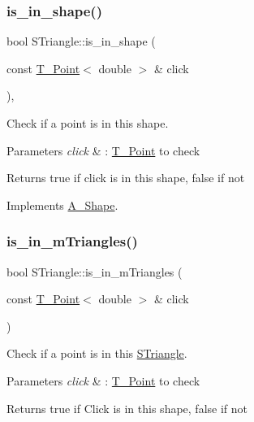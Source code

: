 \subsubsection{\texorpdfstring{is\+\_\+in\+\_\+shape()}{is\_in\_shape()}}
{\footnotesize\ttfamily bool S\+Triangle\+::is\+\_\+in\+\_\+shape (\begin{DoxyParamCaption}\item[{const \hyperlink{classPoint}{T_Point}$<$ double $>$ \&}]{click }\end{DoxyParamCaption})\hspace{0.3cm}{\ttfamily [override]}, {\ttfamily [virtual]}}



Check if a point is in this shape. 


\begin{DoxyParams}{Parameters}
{\em click} & \+: \hyperlink{classPoint}{T_Point} to check \\
\hline
\end{DoxyParams}
\begin{DoxyReturn}{Returns}
true if click is in this shape, false if not 
\end{DoxyReturn}


Implements \hyperlink{classShape_aa09a621da090e42840b4bec7ffb27620}{A_Shape}.

\mbox{\label{classSTriangle_a6824246f68484d8d8159a3315df257a4}} 
\subsubsection{\texorpdfstring{is\+\_\+in\+\_\+mTriangles()}{is\_in\_triangle()}}
{\footnotesize\ttfamily bool S\+Triangle\+::is\+\_\+in\+\_\+mTriangles (\begin{DoxyParamCaption}\item[{const \hyperlink{classPoint}{T_Point}$<$ double $>$ \&}]{click }\end{DoxyParamCaption})}



Check if a point is in this \hyperlink{classSTriangle}{S\+Triangle}. 


\begin{DoxyParams}{Parameters}
{\em click} & \+: \hyperlink{classPoint}{T_Point} to check \\
\hline
\end{DoxyParams}
\begin{DoxyReturn}{Returns}
true if Click is in this shape, false if not
\end{DoxyReturn}
\mbox{\label{classSTriangle_ac72888032cde56407193da9435e2fcc0}} 
